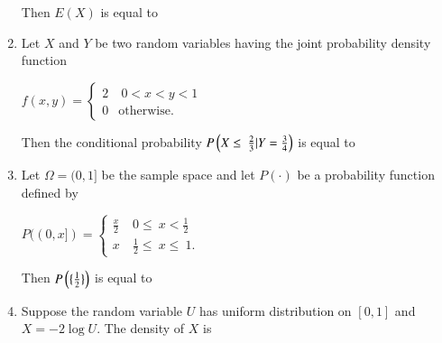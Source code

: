 \documentclass[journal,12pt,twocolumn]{IEEEtran}
\begin{document}
\begin{enumerate}
Then $E(X)$ is equal to \underline{\hspace{3cm}}
\\
\item Let $X$ and $Y$ be two random variables having the joint probability density function

\begin{center}
$ 
f(x,y)=
\begin{cases}
2 &  \ 0<x<y<1 \\
0 & \text{otherwise}.
\end{cases}
$\\ 
\end{center}

Then the conditional probability $P \left(X \leq\ \frac{2}{3} | Y=\frac{3}{4}\right)$ is equal to \underline{\hspace{3cm}}

\begin{enumerate}
\end{enumerate}

\item Let $\Omega= (0,1]$ be the sample space and let $P(\cdot)$ be a probability function defined by 

\begin{center}
$ 
P((0,x])=
\begin{cases}
\frac{x}{2} &  \ 0 \leq\ x< \frac{1}{2} \\
x &  \  \frac{1}{2} \leq\ x \leq\ 1.
\end{cases}
$\\ 
\end{center}

Then $P\left(\lbrace\frac{1}{2}\rbrace\right)$ is equal to \underline{\hspace{3cm}}
\\

\item Suppose the random variable $U$ has uniform distribution on $[0,1]$ and $X= -2\log U$. The density of $X$ is

\begin{enumerate}


\end{enumerate}
\end{enumerate}
\end{document}
